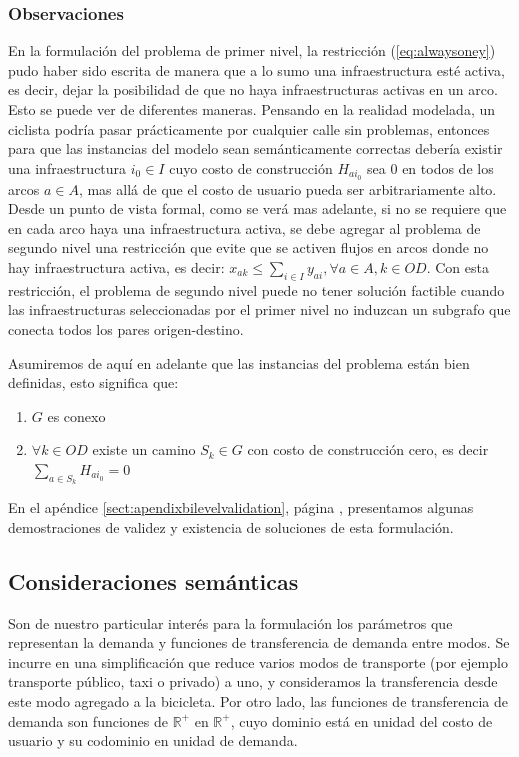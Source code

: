 \documentclass{article}
\begin{document}
  \subsubsection*{Observaciones}

  En la formulación del problema de primer nivel, la restricción (\ref{eq:alwaysoney}) pudo haber sido escrita de manera que a lo sumo una infraestructura esté activa, es decir, dejar la posibilidad de que no haya infraestructuras activas en un arco. Esto se puede ver de diferentes maneras. Pensando en la realidad modelada, un ciclista podría pasar prácticamente por cualquier calle sin problemas, entonces para que las instancias del modelo sean semánticamente correctas debería existir una infraestructura $i_0 \in I$ cuyo costo de construcción $H_{ai_0}$ sea 0 en todos de los arcos $a \in A$, mas allá de que el costo de usuario pueda ser arbitrariamente alto. Desde un punto de vista formal, como se verá mas adelante, si no se requiere que en cada arco haya una infraestructura activa, se debe agregar al problema de segundo nivel una restricción que evite que se activen flujos en arcos donde no hay infraestructura activa, es decir: $x_{ak} \leq \sum_{i \in I} y_{ai}, \forall a \in A, k \in OD$. Con esta restricción, el problema de segundo nivel puede no tener solución factible cuando las infraestructuras seleccionadas por el primer nivel no induzcan un subgrafo que conecta todos los pares origen-destino.

  Asumiremos de aquí en adelante que las instancias del problema están bien definidas, esto significa que:

  \begin{enumerate}
    \item {$G$ es conexo}
    \item {$\forall k \in OD$ existe un camino $S_k \in G$ con costo de construcción cero, es decir $\sum_{a \in S_k} H_{ai_0} = 0$}
  \end{enumerate}

  En el apéndice \ref{sect:apendixbilevelvalidation}, página \pageref{sect:apendixbilevelvalidation}, presentamos algunas demostraciones de validez y existencia de soluciones de esta formulación.

  \subsection{Consideraciones semánticas}

  Son de nuestro particular interés para la formulación los parámetros que representan la demanda y funciones de transferencia de demanda entre modos. Se incurre en una simplificación que reduce varios modos de transporte (por ejemplo transporte público, taxi o privado) a uno, y consideramos la transferencia desde este modo agregado a la bicicleta. Por otro lado, las funciones de transferencia de demanda son funciones de $\mathbb{R}^+$ en $\mathbb{R}^+$, cuyo dominio está en unidad del costo de usuario y su codominio en unidad de demanda.
\end{document}

